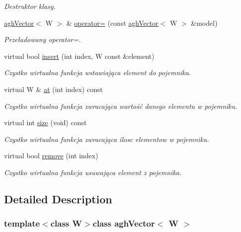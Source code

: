 \begin{DoxyCompactItemize}
\begin{DoxyCompactList}\small\item\em \-Destruktor klasy. \end{DoxyCompactList}\item 
\hyperlink{classaghVector}{agh\-Vector}$<$ \-W $>$ \& \hyperlink{classaghVector_a766ba2e839d42f758a8db8c1eef2e211}{operator=} (const \hyperlink{classaghVector}{agh\-Vector}$<$ \-W $>$ \&model)
\begin{DoxyCompactList}\small\item\em \-Przeładowany operator=. \end{DoxyCompactList}\item 
virtual bool \hyperlink{classaghVector_a4a56140bc2018f715713d6cdb6fd0fd5}{insert} (int index, \-W const \&element)
\begin{DoxyCompactList}\small\item\em \-Czystko wirtualna funkcja wstawiająca element do pojemnika. \end{DoxyCompactList}\item 
virtual \-W \& \hyperlink{classaghVector_a009f08a5484614dc93fcd3deb08a96d0}{at} (int index) const 
\begin{DoxyCompactList}\small\item\em \-Czystko wirtualna funkcja zwracająca wartość danego elementu w pojemniku. \end{DoxyCompactList}\item 
virtual int \hyperlink{classaghVector_a803a1d91c38c07111780488e428c8d29}{size} (void) const 
\begin{DoxyCompactList}\small\item\em \-Czystko wirtualna funkcja zwracająca ilosc elementow w pojemniku. \end{DoxyCompactList}\item 
virtual bool \hyperlink{classaghVector_a593d983663fa6aa2011f4c313f7dcad3}{remove} (int index)
\begin{DoxyCompactList}\small\item\em \-Czystko wirtualna funkcja usuwająca element z pojemnika. \end{DoxyCompactList}\end{DoxyCompactItemize}


\subsection{\-Detailed \-Description}
\subsubsection*{template$<$class \-W$>$class agh\-Vector$<$ W $>$}

